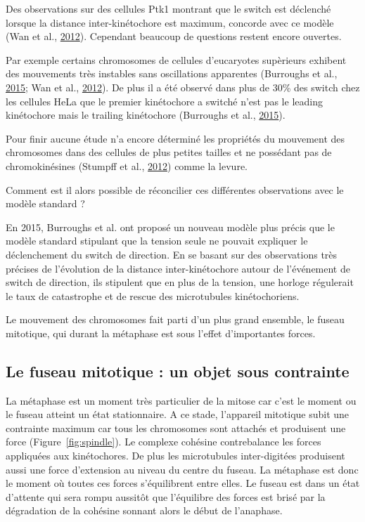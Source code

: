 \documentclass[12pt,a4paper,twoside,openright]{book}
\begin{document}
Des observations sur des cellules Ptk1 montrant que le switch est
déclenché lorsque la distance inter-kinétochore est maximum, concorde
avec ce modèle (Wan et al., \hyperref[ref-Wan2012]{2012}). Cependant
beaucoup de questions restent encore ouvertes.

Par exemple certains chromosomes de cellules d'eucaryotes supèrieurs
exhibent des mouvements très instables sans oscillations apparentes
(Burroughs et al., \hyperref[ref-Burroughs2015]{2015}; Wan et al.,
\hyperref[ref-Wan2012]{2012}). De plus il a été observé dans plus de
30\% des switch chez les cellules HeLa que le premier kinétochore a
switché n'est pas le leading kinétochore mais le trailing kinétochore
(Burroughs et al., \hyperref[ref-Burroughs2015]{2015}).

Pour finir aucune étude n'a encore déterminé les propriétés du mouvement
des chromosomes dans des cellules de plus petites tailles et ne
possédant pas de chromokinésines (Stumpff et al.,
\hyperref[ref-Stumpff2012]{2012}) comme la levure.

Comment est il alors possible de réconcilier ces différentes
observations avec le modèle standard ?

En 2015, Burroughs et al. ont proposé un nouveau modèle plus précis que
le modèle standard stipulant que la tension seule ne pouvait expliquer
le déclenchement du switch de direction. En se basant sur des
observations très précises de l'évolution de la distance
inter-kinétochore autour de l'événement de switch de direction, ils
stipulent que en plus de la tension, une horloge régulerait le taux de
catastrophe et de rescue des microtubules kinétochoriens.

Le mouvement des chromosomes fait parti d'un plus grand ensemble, le
fuseau mitotique, qui durant la métaphase est sous l'effet d'importantes
forces.

\subsection{Le fuseau mitotique : un objet sous
contrainte}\label{le-fuseau-mitotique-un-objet-sous-contrainte}

La métaphase est un moment très particulier de la mitose car c'est le
moment ou le fuseau atteint un état stationnaire. A ce stade, l'appareil
mitotique subit une contrainte maximum car tous les chromosomes sont
attachés et produisent une force (Figure~\ref{fig:spindle}). Le complexe
cohésine contrebalance les forces appliquées aux kinétochores. De plus
les microtubules inter-digitées produisent aussi une force d'extension
au niveau du centre du fuseau. La métaphase est donc le moment où toutes
ces forces s'équilibrent entre elles. Le fuseau est dans un état
d'attente qui sera rompu aussitôt que l'équilibre des forces est brisé
par la dégradation de la cohésine sonnant alors le début de l'anaphase.
\end{document}
